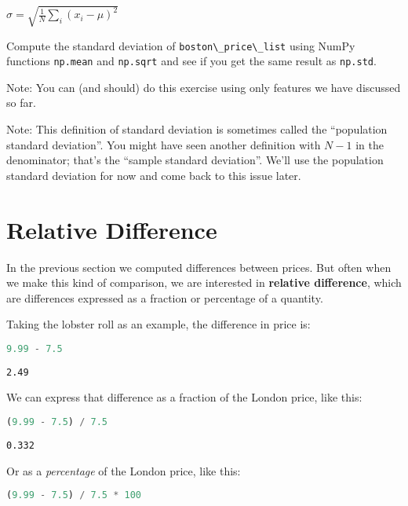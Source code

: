 \(\sigma = \sqrt{\frac{1}{N} \sum_i (x_i - \mu)^2}\)

Compute the standard deviation of
\passthrough{\lstinline!boston\_price\_list!} using NumPy functions
\passthrough{\lstinline!np.mean!} and \passthrough{\lstinline!np.sqrt!}
and see if you get the same result as \passthrough{\lstinline!np.std!}.

Note: You can (and should) do this exercise using only features we have
discussed so far.

Note: This definition of standard deviation is sometimes called the
``population standard deviation''. You might have seen another
definition with \(N-1\) in the denominator; that's the ``sample standard
deviation''. We'll use the population standard deviation for now and
come back to this issue later.

\hypertarget{relative-difference}{%
\section{Relative Difference}\label{relative-difference}}

In the previous section we computed differences between prices. But
often when we make this kind of comparison, we are interested in
\textbf{relative difference}, which are differences expressed as a
fraction or percentage of a quantity.

Taking the lobster roll as an example, the difference in price is:

\begin{lstlisting}[language=Python,style=source]
9.99 - 7.5
\end{lstlisting}

\begin{lstlisting}[style=output]
2.49
\end{lstlisting}

We can express that difference as a fraction of the London price, like
this:

\begin{lstlisting}[language=Python,style=source]
(9.99 - 7.5) / 7.5
\end{lstlisting}

\begin{lstlisting}[style=output]
0.332
\end{lstlisting}

Or as a \emph{percentage} of the London price, like this:

\begin{lstlisting}[language=Python,style=source]
(9.99 - 7.5) / 7.5 * 100
\end{lstlisting}

